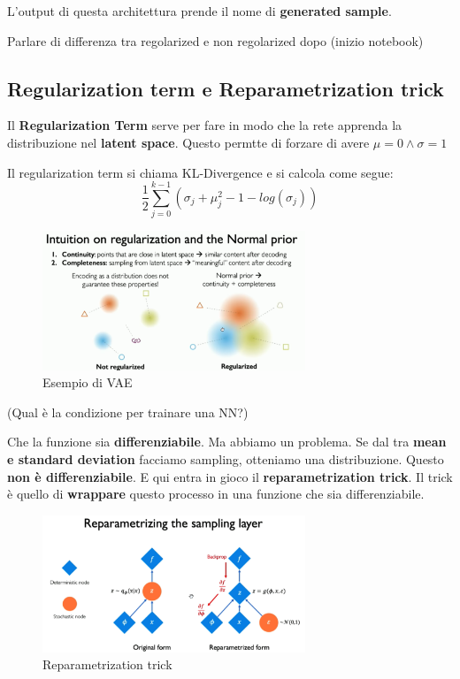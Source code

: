 L'output di questa architettura prende il nome di \textbf{generated sample}.

Parlare di differenza tra regolarized e non regolarized dopo (inizio notebook)

\subsection{Regularization term e Reparametrization trick}

Il \textbf{Regularization Term} serve per fare in modo che la rete apprenda la
distribuzione nel \textbf{latent space}. Questo permtte di forzare di avere
$\mu = 0 \land \sigma = 1$

Il regularization term si chiama KL-Divergence e si calcola come segue:
\begin{equation}
    \frac{1}{2}\sum_{j=0}^{k-1}(\sigma_j+\mu^2_j - 1 - log(\sigma_j))
\end{equation}

\begin{figure}
    \centering
    \includegraphics[width=0.7\textwidth]{images/vae2.png}
    \caption{Esempio di VAE}
\end{figure}

\begin{domanda}(Qual è la condizione per trainare una NN?)
\end{domanda}

Che la funzione sia \textbf{differenziabile}. Ma abbiamo un problema. Se dal
tra \textbf{mean e standard deviation} facciamo sampling, otteniamo una
distribuzione. Questo \textbf{non è differenziabile}. E qui entra in gioco il
\textbf{reparametrization trick}. Il trick è quello di \textbf{wrappare} questo
processo in una funzione che sia differenziabile.

\begin{figure}[H]
    \centering
    \includegraphics[width=0.7\textwidth]{images/reparametrization.png}
    \caption{Reparametrization trick}
\end{figure}

